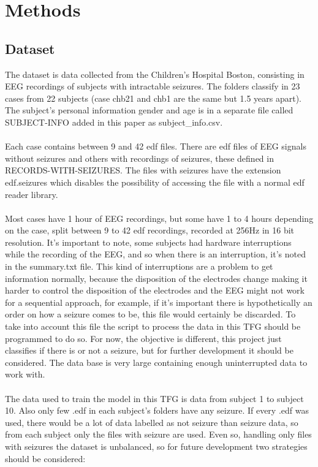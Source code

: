 \section{Methods}
\subsection{Dataset}
The dataset is data collected from the Children’s Hospital Boston, consisting in EEG recordings of subjects with intractable seizures. The folders classify in 23 cases from 22 subjects (case chb21 and chb1 are the same but 1.5 years apart). The subject’s personal information gender and age is in a separate file called SUBJECT-INFO added in this paper as subject\_info.csv.
\\\\
Each case contains between 9 and 42 edf files. There are edf files of EEG signals without seizures and others with recordings of seizures, these defined in RECORDS-WITH-SEIZURES. The files with seizures have the extension edf.seizures which disables the possibility of accessing the file with a normal edf reader library.
\\\\
Most cases have 1 hour of EEG recordings, but some have 1 to 4 hours depending on the case, split between 9 to 42 edf recordings, recorded at 256Hz in 16 bit resolution. It’s important to note, some subjects had hardware interruptions while the recording of the EEG, and so when there is an interruption, it’s noted in the summary.txt file. This kind of interruptions are a problem to get information normally, because the disposition of the electrodes change making it harder to control the disposition of the electrodes and the EEG might not work for a sequential approach, for example, if it’s important there is hypothetically an order on how a seizure comes to be, this file would certainly be discarded. To take into account this file the script to process the data in this TFG should be programmed to do so. For now, the objective is different, this project just classifies if there is or not a seizure, but for further development it should be considered. The data base is very large containing enough uninterrupted data to work with.
\\\\
The data used to train the model in this TFG is data from subject 1 to subject 10. Also only few .edf in each subject’s folders have any seizure. If every .edf was used, there would be a lot of data labelled as not seizure than seizure data, so from each subject only the files with seizure are used. Even so, handling only files with seizures the dataset is unbalanced, so for future development two strategies should be considered:

